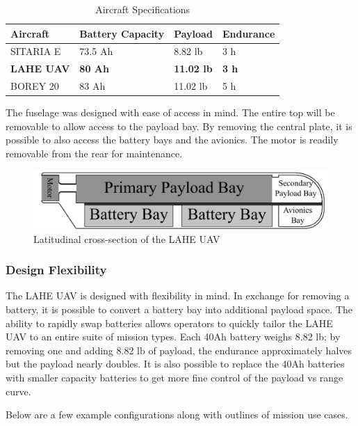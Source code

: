 \documentclass[12pt]{article}
\begin{document}
	\begin{table}[h]
		\centering
		\caption{Aircraft Specifications}
		\begin{tabular}{|l|l|l|l|}
			\hline
			\textbf{Aircraft} & \textbf{Battery Capacity} & \textbf{Payload} & \textbf{Endurance} \\ 
			\hline
			SITARIA E & 73.5 Ah & 8.82 lb & 3 h \\ 
			\hline
			\textbf{LAHE UAV} & \textbf{80 Ah} & \textbf{11.02 lb} & \textbf{3 h} \\ 
			\hline
			BOREY 20 & 83 Ah & 11.02 lb & 5 h \\ 
			\hline
		\end{tabular}
	\end{table}
	
	The fuselage was designed with ease of access in mind. The entire top will be removable to allow access to the payload bay. By removing the central plate, it is possible to also access the battery bays and the avionics. The motor is readily removable from the rear for maintenance.
	
	\begin{figure}[h!]
		\centering
		\includegraphics[width=6 in]{Media/SideCrossSection.png} %
		\caption{Latitudinal cross-section of the LAHE UAV}
	\end{figure}
	
	\subsubsection{Design Flexibility}
	The LAHE UAV is designed with flexibility in mind. In exchange for removing a battery, it is possible to convert a battery bay into additional payload space. The ability to rapidly swap batteries allows operators to quickly tailor the LAHE UAV to an entire suite of mission types. Each 40Ah battery weighs 8.82 lb; by removing one and adding 8.82 lb of payload, the endurance approximately halves but the payload nearly doubles. It is also possible to replace the 40Ah batteries with smaller capacity batteries to get more fine control of the payload vs range curve. 
	
	Below are a few example configurations along with outlines of mission use cases.
	
\end{document}

